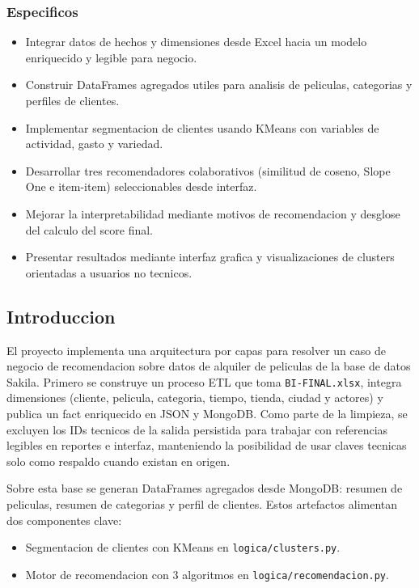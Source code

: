 ﻿\documentclass{article}
\begin{document}
\subsubsection{Especificos}
\begin{itemize}
    \item Integrar datos de hechos y dimensiones desde Excel hacia un modelo enriquecido y legible para negocio.
    \item Construir DataFrames agregados utiles para analisis de peliculas, categorias y perfiles de clientes.
    \item Implementar segmentacion de clientes usando KMeans con variables de actividad, gasto y variedad.
    \item Desarrollar tres recomendadores colaborativos (similitud de coseno, Slope One e item-item) seleccionables desde interfaz.
    \item Mejorar la interpretabilidad mediante motivos de recomendacion y desglose del calculo del score final.
    \item Presentar resultados mediante interfaz grafica y visualizaciones de clusters orientadas a usuarios no tecnicos.
\end{itemize}

\subsection{Introduccion}
El proyecto implementa una arquitectura por capas para resolver un caso de negocio de recomendacion sobre datos de alquiler de peliculas de la base de datos Sakila. Primero se construye un proceso ETL que toma \texttt{BI-FINAL.xlsx}, integra dimensiones (cliente, pelicula, categoria, tiempo, tienda, ciudad y actores) y publica un fact enriquecido en JSON y MongoDB. Como parte de la limpieza, se excluyen los IDs tecnicos de la salida persistida para trabajar con referencias legibles en reportes e interfaz, manteniendo la posibilidad de usar claves tecnicas solo como respaldo cuando existan en origen.

Sobre esta base se generan DataFrames agregados desde MongoDB: resumen de peliculas, resumen de categorias y perfil de clientes. Estos artefactos alimentan dos componentes clave:
\begin{itemize}
    \item Segmentacion de clientes con KMeans en \texttt{logica/clusters.py}.
    \item Motor de recomendacion con 3 algoritmos en \texttt{logica/recomendacion.py}.
\end{itemize}
\end{document}
